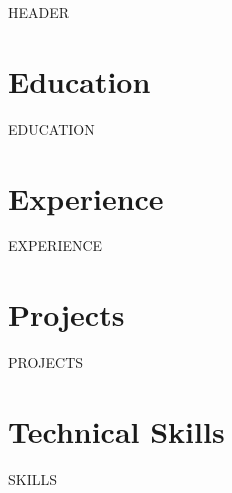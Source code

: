 \documentclass[letterpaper,11pt]{article}
\begin{document}
{{HEADER}}

\section{Education}
{{EDUCATION}}

\section{Experience}
{{EXPERIENCE}}

\section{Projects}
{{PROJECTS}}

\section{Technical Skills}
{{SKILLS}}
\end{document}
